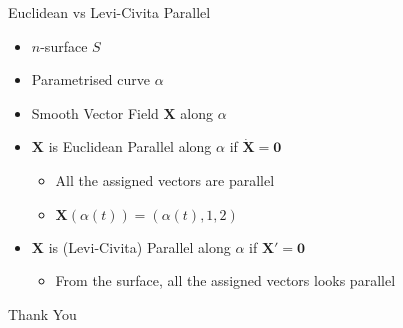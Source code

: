 \documentclass{beamer}
\begin{document}
\begin{frame}{Euclidean vs Levi-Civita Parallel}
\begin{itemize}
	\item $n$-surface $S$
	\item Parametrised curve $\alpha$
	\item Smooth Vector Field $\mathbf{X}$ along $\alpha$
\end{itemize}
\begin{definition}[Parallel]
\begin{itemize}
	\item $\mathbf{X}$ is Euclidean Parallel along $\alpha$ if $\dot{\mathbf{X}} = \mathbf{0}$
	\begin{itemize}
		\item All the assigned vectors are parallel
		\item $\mathbf{X}(\alpha(t)) = (\alpha(t),1,2)$
	\end{itemize}
	\item $\mathbf{X}$ is (Levi-Civita) Parallel along $\alpha$ if $\mathbf{X}' = \mathbf{0}$
	\begin{itemize}
		\item From the surface, all the assigned vectors looks parallel
	\end{itemize}
\end{itemize}
\end{definition}
\end{frame}

\begin{frame}
	\vspace{0.6in}
	\hspace{3cm} {\color{blue}\Huge{Thank You}}
\end{frame}
\end{document}
